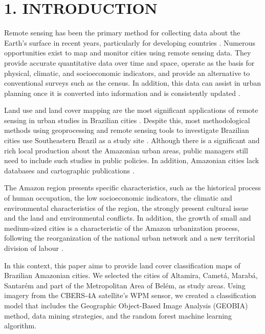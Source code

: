 \documentclass[preprint, 3p,
authoryear]{elsarticle} %
\begin{document}
\hypertarget{introduction}{%
\section{1. INTRODUCTION}\label{introduction}}

Remote sensing has been the primary method for collecting data about the
Earth's surface in recent years, particularly for developing countries
\citep{zhu2022urban}. Numerous opportunities exist to map and monitor
cities using remote sensing data. They provide accurate quantitative
data over time and space, operate as the basis for physical, climatic,
and socioeconomic indicators, and provide an alternative to conventional
surveys such as the census. In addition, this data can assist in urban
planning once it is converted into information and is consistently
updated \citep{Weng2018}.

Land use and land cover mapping are the most significant applications of
remote sensing in urban studies in Brazilian cities \citep{Almeida2010}.
Despite this, most methodological methods using geoprocessing and remote
sensing tools to investigate Brazilian cities use Southeastern Brazil as
a study site \citep{Santos2022}. Although there is a significant and
rich local production about the Amazonian urban areas, public managers
still need to include such studies in public policies. In addition,
Amazonian cities lack databases and cartographic publications
\citep{Cardoso2020}.

The Amazon region presents specific characteristics, such as the
historical process of human occupation, the low socioeconomic
indicators, the climatic and environmental characteristics of the
region, the strongly present cultural issue and the land and
environmental conflicts. In addition, the growth of small and
medium-sized cities is a characteristic of the Amazon urbanization
process, following the reorganization of the national urban network and
a new territorial division of labour \citep{Trindade1998, Trindade2011}.

In this context, this paper aims to provide land cover classification
maps of Brazilian Amazonian cities. We selected the cities of Altamira,
Cametá, Marabá, Santarém and part of the Metropolitan Area of Belém, as
study areas. Using imagery from the CBERS-4A satellite's WPM sensor, we
created a classification model that includes the Geographic Object-Based
Image Analysis (GEOBIA) method, data mining strategies, and the random
forest machine learning algorithm.
\end{document}
